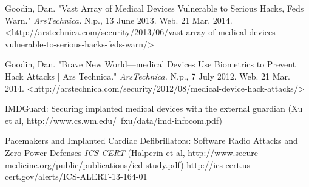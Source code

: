 \documentclass[11pt]{article}
\numberwithin{theorem}{subsection}
\begin{document}
\begin{thebibliography}{9}

        Goodin, Dan. "Vast Array of Medical Devices Vulnerable to Serious Hacks, Feds Warn." \emph{ArsTechnica.} N.p., 13 June 2013. Web. 21 Mar. 2014. <http://arstechnica.com/security/2013/06/vast-array-of-medical-devices-vulnerable-to-serious-hacks-feds-warn/>

        Goodin, Dan. "Brave New World—medical Devices Use Biometrics to Prevent Hack Attacks | Ars Technica." \emph{ArsTechnica.} N.p., 7 July 2012. Web. 21 Mar. 2014. <http://arstechnica.com/security/2012/08/medical-device-hack-attacks/>
        
        IMDGuard: Securing implanted medical devices with the external guardian
        (Xu et al, http://www.cs.wm.edu/~fxu/data/imd-infocom.pdf)
        
        Pacemakers and Implanted Cardiac Defibrillators: Software Radio Attacks and Zero-Power Defenses \emph{ICS-CERT}
        (Halperin et al, http://www.secure-medicine.org/public/publications/icd-study.pdf)
        http://ics-cert.us-cert.gov/alerts/ICS-ALERT-13-164-01

\end{thebibliography}
\end{document}
